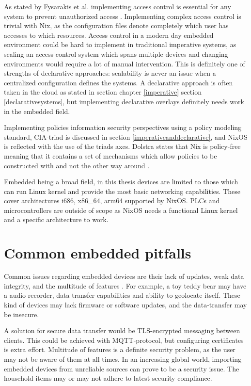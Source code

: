 As stated by Fysarakis et al. implementing access control is essential
for any system to prevent unauthorized access
\cite{fysarakis2014embedded}. Implementing complex access control is
trivial with Nix, as the configuration files denote completely which
user has accesses to which resources. Access control in a modern day
embedded environment could be hard to implement in traditional
imperative systems, as scaling an access control system which spans
multiple devices and changing environments would require a lot of
manual intervention. This is definitely one of strengths of
declarative approaches: scalability is never an issue when a
centralized configuration defines the systems. A declarative approach
is often taken in the cloud as stated in section chapter
\ref{imperative} section \ref{declarativesystems}, but implementing declarative overlays
definitely needs work in the embedded field.

Implementing policies information security perspectives using a policy
modeling standard, CIA-triad is discussed in section \ref{imperativeanddeclarative}, and NixOS is reflected with
the use of the triads axes. Dolstra states that Nix is policy-free
meaning that it contains a set of mechanisms which allow policies to
be constructed with and not the other way around \cite{dolstra2004nix}.

Embedded being a broad field, in this thesis devices are limited to
those which can run Linux kernel and provide the most basic networking
capabilities. These cover architectures i686, x86\_64, arm64 supported
by NixOS. PLCs and microcontrollers are outside of scope as NixOS
needs a functional Linux kernel and a specific architecture to work.

\section{Common embedded pitfalls}

Common issues regarding embedded devices are their lack of updates,
weak data integrity, and the multitude of features
\cite{kemmerer2003cybersecurity, fysarakis2014embedded}. For
example, a toy teddy bear may have a audio recorder, data transfer
capabilities and ability to geolocate itself. These kind of devices
may lack firmware or software updates, and the data-transfer may be
insecure.

A solution for secure data transfer would be TLS-encrypted messaging
between clients. This could be achieved with MQTT-protocol, but
configuring certificates is extra effort. Multitude of features is a
definite security problem, as the user may not be aware of them at all
times. In an increasing global world, importing embedded devices from
unreliable sources can prove to be a security issue. The household
items may or may not adhere to latest security
compliance. \cite{fysarakis2014embedded}

